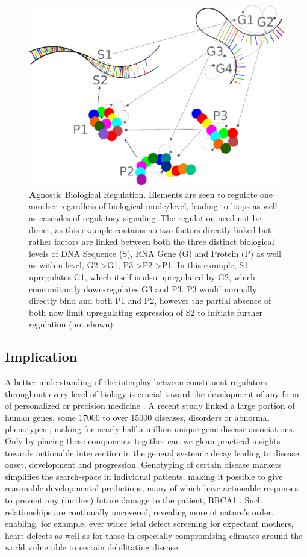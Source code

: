 \begin{figure}%
\centering
\includegraphics[width=1\linewidth]{2/DNA2.eps}
\caption{{\textbf Agnostic Biological Regulation.} Elements are seen to regulate one another regardless of biological mode/level, leading to loops as well as cascades of regulatory signaling. The regulation need not be direct, as this example contains no two factors directly linked but rather factors are linked between both the three distinct biological levels of DNA Sequence (S), RNA Gene (G) and Protein (P) as well as within level, \ie G2->G1, P3->P2->P1. In this example, S1 upregulates G1, which itself is also upregulated by G2, which concomitantly down-regulates G3 and P3. P3 would normally directly bind and  both P1 and P2, however the partial absence of both now limit upregulating expression of S2 to initiate further regulation (not shown).
}
\label{fig:DNA}
\end{figure}


\subsection{Implication}
\label{sec:practical}
A better understanding of the interplay between constituent regulators throughout every level of biology is crucial toward the development of any form of personalized or precision medicine \citep{barabasi2011network}. A recent study linked a large portion of human genes, some 17000 to over 15000 diseases, disorders or abnormal phenotypes \citep{pinero2015disgenet}, making for nearly half a million unique gene-disease associations. Only by placing these components together can we glean practical insights towards actionable intervention in the general systemic decay leading to disease onset, development and progression. Genotyping of certain disease markers simplifies the search-space in individual patients, making it possible to give reasonable developmental predictions, many of which have actionable responses to prevent any (further) future damage to the patient, \ie BRCA1 \citep{lerman1996brca1}. Such relationships are continually uncovered, revealing more of nature's order, enabling, for example, ever wider fetal defect screening for expectant mothers, \ie heart defects \citep{hyett1999using} as well as for those in especially compromising climates around the world vulnerable to certain debilitating disease.

